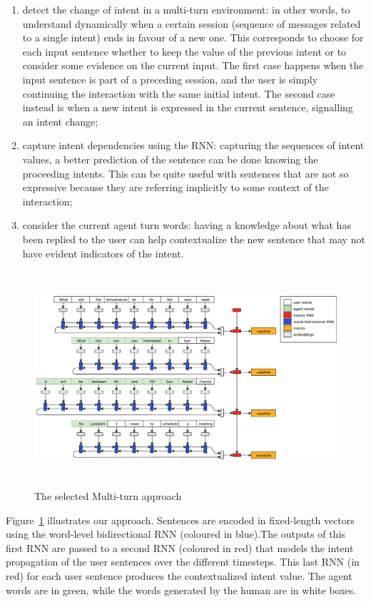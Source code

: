 \begin{enumerate}
	\item detect the change of intent in a multi-turn environment: in other words, to understand dynamically when a certain session (sequence of messages related to a single intent) ends in favour of a new one. This corresponds to choose for each input sentence whether to keep the value of the previous intent or to consider some evidence on the current input. The first case happens when the input sentence is part of a preceding session, and the user is simply continuing the interaction with the same initial intent. The second case instead is when a new intent is expressed in the current sentence, signalling an intent change;
	\item capture intent dependencies using the RNN: capturing the sequences of intent values, a better prediction of the sentence can be done knowing the proceeding intents. This can be quite useful with sentences that are not so expressive because they are referring implicitly to some context of the interaction;
	\item consider the current agent turn words: having a knowledge about what has been replied to the user can help contextualize the new sentence that may not have evident indicators of the intent.
\end{enumerate}

\begin{figure}[!htb]
    \centering
    \includegraphics[max width=0.9\linewidth,max height=8cm,keepaspectratio]{figures/approachMultiTurn}
    \caption{The selected Multi-turn approach}\label{fig:approachMultiTurn}
\end{figure}

Figure~\ref{fig:approachMultiTurn} illustrates our approach. Sentences are encoded in fixed-length vectors using the word-level bidirectional RNN (coloured in blue).The outputs of this first RNN are passed to a second RNN (coloured in red) that models the intent propagation of the user sentences over the different timesteps. This last RNN (in red) for each user sentence produces the contextualized intent value. The agent words are in green, while the words generated by the human are in white boxes.

